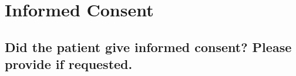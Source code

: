 \section{Informed Consent}
\subsection{Did the patient give informed consent? Please provide if requested.}
